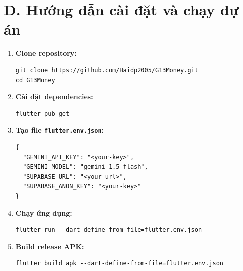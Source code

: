 \section*{D. Hướng dẫn cài đặt và chạy dự án}

\begin{enumerate}
  \item \textbf{Clone repository:}
  \begin{lstlisting}[basicstyle=\ttfamily\small, frame=none, numbers=none]
git clone https://github.com/Haidp2005/G13Money.git
cd G13Money
  \end{lstlisting}

  \item \textbf{Cài đặt dependencies:}
  \begin{lstlisting}[basicstyle=\ttfamily\small, frame=none, numbers=none]
flutter pub get
  \end{lstlisting}

  \item \textbf{Tạo file \texttt{flutter.env.json}:}
  \begin{lstlisting}[style=jsonStyle, caption={flutter.env.json}]
{
  "GEMINI_API_KEY": "<your-key>",
  "GEMINI_MODEL": "gemini-1.5-flash",
  "SUPABASE_URL": "<your-url>",
  "SUPABASE_ANON_KEY": "<your-key>"
}
  \end{lstlisting}

  \item \textbf{Chạy ứng dụng:}
  \begin{lstlisting}[basicstyle=\ttfamily\small, frame=none, numbers=none]
flutter run --dart-define-from-file=flutter.env.json
  \end{lstlisting}

  \item \textbf{Build release APK:}
  \begin{lstlisting}[basicstyle=\ttfamily\small, frame=none, numbers=none]
flutter build apk --dart-define-from-file=flutter.env.json
  \end{lstlisting}
\end{enumerate}

